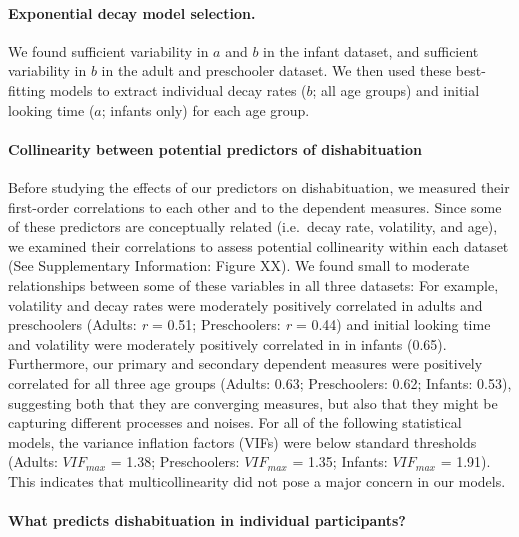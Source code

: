\documentclass[10pt, letterpaper]{article}
\begin{document}
\hypertarget{exponential-decay-model-selection.}{%
\paragraph{Exponential decay model
selection.}\label{exponential-decay-model-selection.}}

We found sufficient variability in \(a\) and \(b\) in the infant
dataset, and sufficient variability in \(b\) in the adult and
preschooler dataset. We then used these best-fitting models to extract
individual decay rates (\(b\); all age groups) and initial looking time
(\(a\); infants only) for each age group.

\hypertarget{collinearity-between-potential-predictors-of-dishabituation}{%
\paragraph{Collinearity between potential predictors of
dishabituation}\label{collinearity-between-potential-predictors-of-dishabituation}}

Before studying the effects of our predictors on dishabituation, we
measured their first-order correlations to each other and to the
dependent measures. Since some of these predictors are conceptually
related (i.e.~decay rate, volatility, and age), we examined their
correlations to assess potential collinearity within each dataset (See
Supplementary Information: Figure XX). We found small to moderate
relationships between some of these variables in all three datasets: For
example, volatility and decay rates were moderately positively
correlated in adults and preschoolers (Adults: \emph{r} = 0.51;
Preschoolers: \emph{r} = 0.44) and initial looking time and volatility
were moderately positively correlated in in infants (0.65). Furthermore,
our primary and secondary dependent measures were positively correlated
for all three age groups (Adults: 0.63; Preschoolers: 0.62; Infants:
0.53), suggesting both that they are converging measures, but also that
they might be capturing different processes and noises. For all of the
following statistical models, the variance inflation factors (VIFs) were
below standard thresholds (Adults: \(VIF_{max}\) = 1.38; Preschoolers:
\(VIF_{max}\) = 1.35; Infants: \(VIF_{max}\) = 1.91). This indicates
that multicollinearity did not pose a major concern in our models.

\hypertarget{what-predicts-dishabituation-in-individual-participants}{%
\paragraph{What predicts dishabituation in individual
participants?}\label{what-predicts-dishabituation-in-individual-participants}}
\end{document}
